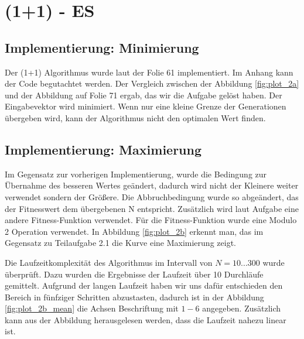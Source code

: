 \setcounter{chapter}{1}

\chapter{(1+1) - ES}

\section{Implementierung: Minimierung}

Der (1+1) Algorithmus wurde laut der Folie 61 implementiert. Im Anhang kann der Code begutachtet werden. Der Vergleich zwischen der Abbildung \ref{fig:plot_2a} und der Abbildung auf Folie 71 ergab, das wir die Aufgabe gelöst haben. Der Eingabevektor wird minimiert. Wenn nur eine kleine Grenze der Generationen übergeben wird, kann der Algorithmus nicht den optimalen Wert finden.


\section{Implementierung: Maximierung}

Im Gegensatz zur vorherigen Implementierung, wurde die Bedingung zur Übernahme des besseren Wertes geändert, dadurch wird nicht der Kleinere weiter verwendet sondern der Größere. Die Abbruchbedingung wurde so abgeändert, das der Fitnesswert dem übergebenen N entspricht. Zusätzlich wird laut Aufgabe eine andere Fitness-Funktion verwendet. Für die Fitness-Funktion wurde eine Modulo 2 Operation verwendet. In Abbildung \ref{fig:plot_2b} erkennt man, das im Gegensatz zu Teilaufgabe 2.1 die Kurve eine Maximierung zeigt.


\newpage

Die Laufzeitkomplexität des Algorithmus im Intervall von $N=10 ... 300$ wurde überprüft. Dazu wurden die Ergebnisse der Laufzeit über 10 Durchläufe gemittelt. Aufgrund der langen Laufzeit haben wir uns dafür entschieden den Bereich in fünfziger Schritten abzustasten, dadurch ist in der Abbildung \ref{fig:plot_2b_mean} die Achsen Beschriftung mit $1-6$ angegeben. Zusätzlich kann aus der Abbildung herausgelesen werden, dass die Laufzeit nahezu linear ist.


